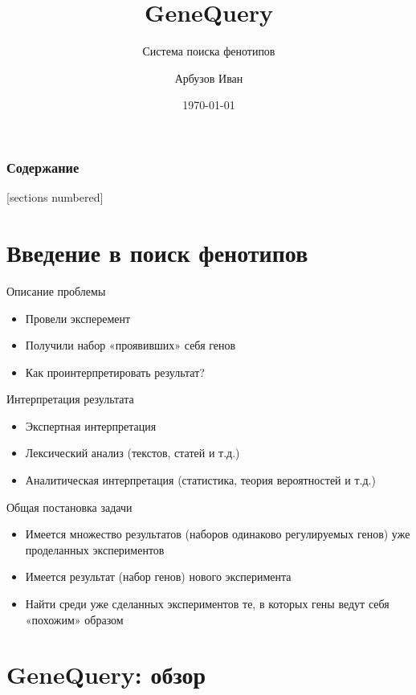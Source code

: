 \documentclass[10pt,pdf,utf8,russian,aspectratio=169]{beamer}
\title{GeneQuery}
\subtitle{Система поиска фенотипов}
\date{\today}
\author{Арбузов Иван}
\institute{Институт Биоинформатики}
\begin{document}
\maketitle

\begin{frame}
  \frametitle{Содержание}
  [sections numbered]
  \tableofcontents
\end{frame}

\section{Введение в поиск фенотипов}

\begin{frame}{Описание проблемы}
  \begin{itemize}[<+->]
    \item Провели эксперемент
    \item Получили набор «проявивших» себя генов
    \item \alert{Как проинтерпретировать результат?}
  \end{itemize}
\end{frame}

\begin{frame}{Интерпретация результата}
  \begin{itemize}[<+->]
    \item Экспертная интерпретация
    \item Лексический анализ (текстов, статей и т.д.)
    \item \alert<4> {Аналитическая интерпретация (статистика, теория вероятностей и т.д.)}
  \end{itemize}
\end{frame}

\begin{frame}{Общая постановка задачи}
  \begin{itemize}[<+->]
    \item Имеется множество результатов (наборов одинаково регулируемых генов) уже проделанных экспериментов
    \item Имеется результат (набор генов) нового эксперимента
    \item Найти среди уже сделанных экспериментов те, в которых гены ведут себя \alert<4>{«похожим»} образом
  \end{itemize}
\end{frame}


\section{GeneQuery: обзор}
\end{document}
